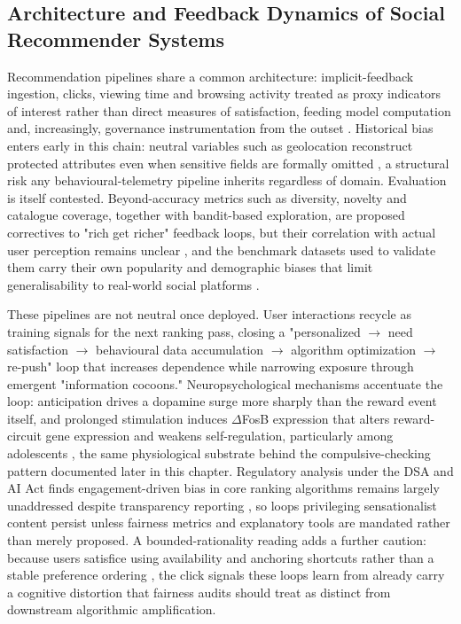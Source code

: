 \documentclass[11pt]{article}
\begin{document}
\subsection{Architecture and Feedback Dynamics of Social Recommender Systems}
\label{sec:architecture_feedback_dynamics} Recommendation pipelines share a common architecture: implicit-feedback ingestion, clicks, viewing time and browsing activity treated as proxy indicators of interest rather than direct measures of satisfaction, feeding model computation and, increasingly, governance instrumentation from the outset \parencites[21]{6249388}. Historical bias enters early in this chain: neutral variables such as geolocation reconstruct protected attributes even when sensitive fields are formally omitted \parencites[4]{8907572}, a structural risk any behavioural-telemetry pipeline inherits regardless of domain. Evaluation is itself contested. Beyond-accuracy metrics such as diversity, novelty and catalogue coverage, together with bandit-based exploration, are proposed correctives to "rich get richer" feedback loops, but their correlation with actual user perception remains unclear \parencites[15]{2190386}, and the benchmark datasets used to validate them carry their own popularity and demographic biases that limit generalisability to real-world social platforms \parencites[21]{6249388}.

These pipelines are not neutral once deployed. User interactions recycle as training signals for the next ranking pass, closing a "personalized $\rightarrow$ need satisfaction $\rightarrow$ behavioural data accumulation $\rightarrow$ algorithm optimization $\rightarrow$ re-push" loop that increases dependence while narrowing exposure through emergent "information cocoons." Neuropsychological mechanisms accentuate the loop: anticipation drives a dopamine surge more sharply than the reward event itself, and prolonged stimulation induces $\Delta$FosB expression that alters reward-circuit gene expression and weakens self-regulation, particularly among adolescents \parencites[3]{8958037}, the same physiological substrate behind the compulsive-checking pattern documented later in this chapter. Regulatory analysis under the DSA and AI Act finds engagement-driven bias in core ranking algorithms remains largely unaddressed despite transparency reporting \parencites[5]{5142478}[8]{5142478}[9]{5142478}, so loops privileging sensationalist content persist unless fairness metrics and explanatory tools are mandated rather than merely proposed. A bounded-rationality reading adds a further caution: because users satisfice using availability and anchoring shortcuts rather than a stable preference ordering \parencites[4]{3232181}, the click signals these loops learn from already carry a cognitive distortion that fairness audits should treat as distinct from downstream algorithmic amplification.
\end{document}
